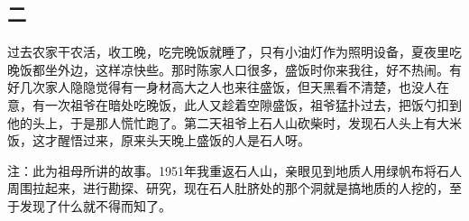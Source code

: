 \subsection*{二}

过去农家干农活，收工晚，吃完晚饭就睡了，只有小油灯作为照明设备，夏夜里吃晚饭都坐外边，这样凉快些。那时陈家人口很多，盛饭时你来我往，好不热闹。有好几次家人隐隐觉得有一身材高大之人也来往盛饭，但天黑看不清楚，也没人在意，有一次祖爷在暗处吃晚饭，此人又趁着空隙盛饭，祖爷猛扑过去，把饭勺扣到他的头上，于是那人慌忙跑了。第二天祖爷上石人山砍柴时，发现石人头上有大米饭，这才醒悟过来，原来头天晚上盛饭的人是石人呀。

注：此为祖母所讲的故事。1951年我重返石人山，亲眼见到地质人用绿帆布将石人周围拉起来，进行勘探、研究，现在石人肚脐处的那个洞就是搞地质的人挖的，至于发现了什么就不得而知了。


